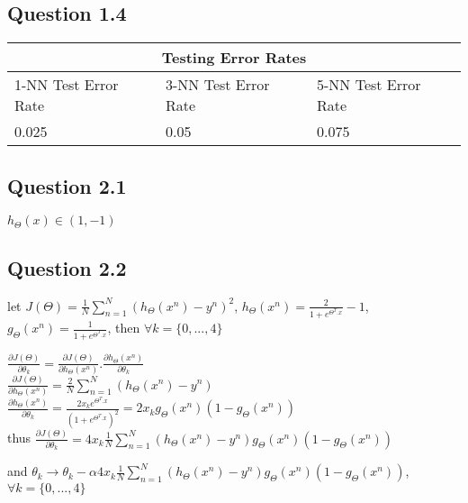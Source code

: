 \documentclass[10pt]{article}
\begin{document}
\bigskip
\subsection*{Question 1.4}
\begin{tabular}{ 
|p{4cm}||p{4cm}|p{4cm}|  }
 \hline
 \multicolumn{3}{|c|}{Testing Error Rates} \\
 \hline
 
 1-NN Test Error Rate & 3-NN Test Error Rate & 5-NN Test Error Rate\\
 \hline
 0.025&0.05&0.075\\
 \hline
 
\end{tabular}

\bigskip

\subsection*{Question 2.1}
$ h_{\Theta}(x) \in (1,-1)$

\subsection*{Question 2.2}
\noindent let $J(\Theta) = \frac{1}{N}\sum_{n = 1}^{N} (h_{\Theta}(x^{n}) - y^{n})^{2}$,\quad
\noindent $ h_{\Theta}(x^{n}) = \frac{2}{1 + e^{\Theta^{T}.x}} - 1 $,\quad
\noindent $ g_{\Theta}(x^{n}) = \frac{1}{1 + e^{\Theta^{T}.x}} $,\quad
\noindent then $\forall k = \{0, ..., 4\}$\\ \medskip

\noindent $\frac{\partial J(\Theta)}{\partial \theta_{k}} = \frac{\partial J(\Theta)}{\partial h_{\Theta}(x^{n})} . \frac{\partial h_{\Theta}(x^{n})}{\partial \theta_{k}}$\\
\noindent $\frac{\partial J(\Theta)}{\partial h_{\Theta}(x^{n})} = \frac{2}{N}\sum_{n = 1}^{N} (h_{\Theta}(x^{n}) - y^{n})$ \\
\noindent $\frac{\partial h_{\Theta}(x^{n})}{\partial \theta_{k}} = \frac{2 x_{k} e^{\Theta^{T}.x}}{(1 + e^{\Theta^{T}.x})^{2}} = 2 x_{k} g_{\Theta}(x^{n}) (1 - g_{\Theta}(x^{n}))$\\
\noindent thus $\frac{\partial J(\Theta)}{\partial \theta_{k}} = 4 x_{k} \frac{1}{N}\sum_{n = 1}^{N} (h_{\Theta}(x^{n}) - y^{n}) g_{\Theta}(x^{n}) (1 - g_{\Theta}(x^{n}))$ \\ \bigskip

\noindent and $\theta_{k} \to \theta_{k} - \alpha 4 x_{k} \frac{1}{N}\sum_{n = 1}^{N} (h_{\Theta}(x^{n}) - y^{n}) g_{\Theta}(x^{n}) (1 - g_{\Theta}(x^{n}))$, $\forall k = \{0, ..., 4\}$
\end{document}
